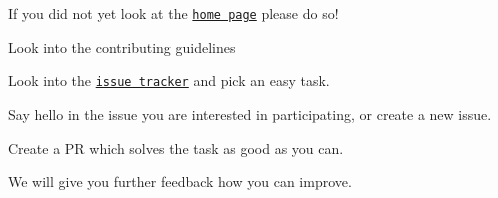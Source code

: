 \begin{DoxyItemize}
\item If you did not yet look at the \href{https://www.libelektra.org/}{\tt home page} please do so!
\item Look into the contributing guidelines
\item Look into the \href{https://issues.libelektra.org/}{\tt issue tracker} and pick an easy task.
\item Say hello in the issue you are interested in participating, or create a new issue.
\item Create a PR which solves the task as good as you can.
\item We will give you further feedback how you can improve. 
\end{DoxyItemize}